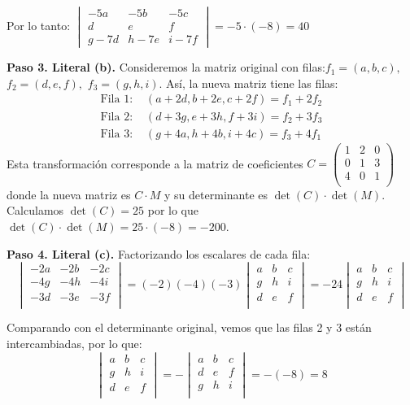 \begin{prob}
\begin{myproof}
Por lo tanto: $\begin{vmatrix}
-5a&-5b&-5c\\d&e&f\\g-7d&h-7e&i-7f
\end{vmatrix} = -5 \cdot (-8) = \boxed{40}$

\textbf{Paso 3. Literal (b).} Consideremos la matriz original con filas:$f_1 = (a, b, c),$ $f_2 = (d, e, f),$ $f_3 = (g, h, i).$ Así, la nueva matriz tiene las filas:
\begin{align*}
\text{Fila 1: } & (a+2d, b+2e, c+2f) = f_1 + 2f_2 \\
\text{Fila 2: } & (d+3g, e+3h, f+3i) = f_2 + 3f_3 \\
\text{Fila 3: } & (g+4a, h+4b, i+4c) = f_3 + 4f_1
\end{align*}
Esta transformación corresponde a la matriz de coeficientes $
C = \begin{pmatrix}
1 & 2 & 0 \\
0 & 1 & 3 \\
4 & 0 & 1 \\
\end{pmatrix}$ donde la nueva matriz es $C \cdot M$ y su determinante es $\det(C) \cdot \det(M)$. Calculamos $\det(C)= 25$ por lo que $ \det(C) \cdot \det(M) = 25 \cdot (-8) = \boxed{-200}.$

\textbf{Paso 4. Literal (c).} Factorizando los escalares de cada fila:
$$\begin{vmatrix}
-2a&-2b&-2c\\-4g&-4h&-4i\\-3d&-3e&-3f\\
\end{vmatrix} = (-2)(-4)(-3)\begin{vmatrix}
a&b&c\\g&h&i\\d&e&f\\
\end{vmatrix}= -24\begin{vmatrix}
a&b&c\\g&h&i\\d&e&f\\
\end{vmatrix}$$

Comparando con el determinante original, vemos que las filas 2 y 3 están intercambiadas, por lo que:
$$\begin{vmatrix}
a&b&c\\g&h&i\\d&e&f\\
\end{vmatrix} = -\begin{vmatrix}
a&b&c\\d&e&f\\g&h&i\\
\end{vmatrix} = -(-8) = 8$$


\end{myproof}
\end{prob}
